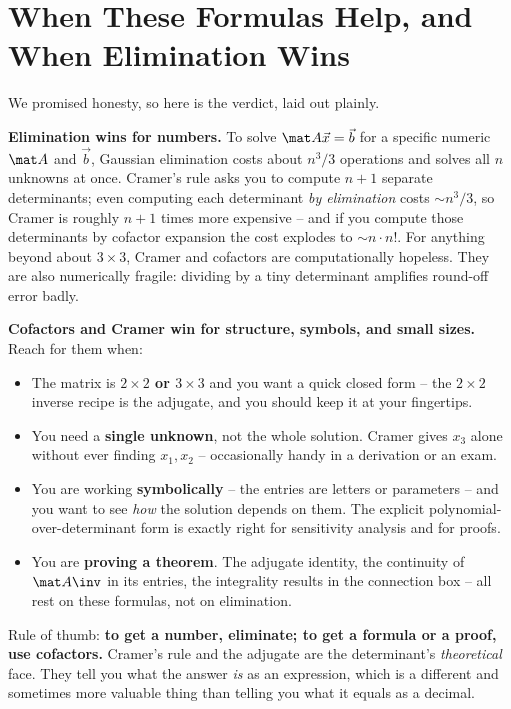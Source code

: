 \section{When These Formulas Help, and When Elimination Wins}\label{ch22:sec-when}

We promised honesty, so here is the verdict, laid out plainly.

\textbf{Elimination wins for numbers.} To solve $\mat A\vec x=\vec b$ for a specific numeric $\mat A$
and $\vec b$, Gaussian elimination costs about $n^3/3$ operations and solves all $n$ unknowns at once.
Cramer's rule asks you to compute $n+1$ separate determinants; even computing each determinant
\emph{by elimination} costs $\sim n^3/3$, so Cramer is roughly $n+1$ times more expensive -- and if
you compute those determinants by cofactor expansion the cost explodes to $\sim n\cdot n!$. For
anything beyond about $3\times3$, Cramer and cofactors are computationally hopeless. They are also
numerically fragile: dividing by a tiny determinant amplifies round-off error badly.

\textbf{Cofactors and Cramer win for structure, symbols, and small sizes.} Reach for them when:
\begin{itemize}
\item The matrix is \textbf{$2\times2$ or $3\times3$} and you want a quick closed form -- the $2\times
  2$ inverse recipe is the adjugate, and you should keep it at your fingertips.
\item You need a \textbf{single unknown}, not the whole solution. Cramer gives $x_3$ alone without
  ever finding $x_1,x_2$ -- occasionally handy in a derivation or an exam.
\item You are working \textbf{symbolically} -- the entries are letters or parameters -- and you want
  to see \emph{how} the solution depends on them. The explicit polynomial-over-determinant form is
  exactly right for sensitivity analysis and for proofs.
\item You are \textbf{proving a theorem}. The adjugate identity, the continuity of $\mat A\inv$ in its
  entries, the integrality results in the connection box -- all rest on these formulas, not on
  elimination.
\end{itemize}

\begin{focusbox}
Rule of thumb: \textbf{to get a number, eliminate; to get a formula or a proof, use cofactors.}
Cramer's rule and the adjugate are the determinant's \emph{theoretical} face. They tell you what the
answer \emph{is} as an expression, which is a different and sometimes more valuable thing than telling
you what it equals as a decimal.
\end{focusbox}

